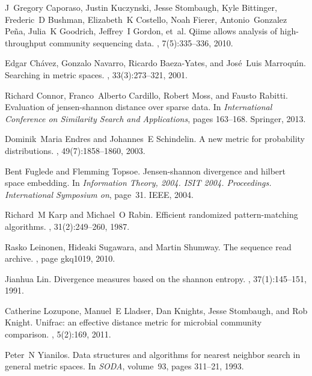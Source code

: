 \documentclass[10pt,letterpaper]{article}
\begin{document}
\begin{thebibliography}{10}

J~Gregory Caporaso, Justin Kuczynski, Jesse Stombaugh, Kyle Bittinger,
  Frederic~D Bushman, Elizabeth~K Costello, Noah Fierer, Antonio~Gonzalez
  Pe{\~n}a, Julia~K Goodrich, Jeffrey~I Gordon, et~al.
\newblock Qiime allows analysis of high-throughput community sequencing data.
, 7(5):335--336, 2010.

Edgar Ch{\'a}vez, Gonzalo Navarro, Ricardo Baeza-Yates, and Jos{\'e}~Luis
  Marroqu{\'\i}n.
\newblock Searching in metric spaces.
, 33(3):273--321, 2001.

Richard Connor, Franco~Alberto Cardillo, Robert Moss, and Fausto Rabitti.
\newblock Evaluation of jensen-shannon distance over sparse data.
\newblock In {\em International Conference on Similarity Search and
  Applications}, pages 163--168. Springer, 2013.

Dominik~Maria Endres and Johannes~E Schindelin.
\newblock A new metric for probability distributions.
, 49(7):1858--1860,
  2003.

Bent Fuglede and Flemming Topsoe.
\newblock Jensen-shannon divergence and hilbert space embedding.
\newblock In {\em Information Theory, 2004. ISIT 2004. Proceedings.
  International Symposium on}, page~31. IEEE, 2004.

Richard~M Karp and Michael~O Rabin.
\newblock Efficient randomized pattern-matching algorithms.
, 31(2):249--260, 1987.

Rasko Leinonen, Hideaki Sugawara, and Martin Shumway.
\newblock The sequence read archive.
, page gkq1019, 2010.

Jianhua Lin.
\newblock Divergence measures based on the shannon entropy.
, 37(1):145--151, 1991.

Catherine Lozupone, Manuel~E Lladser, Dan Knights, Jesse Stombaugh, and Rob
  Knight.
\newblock Unifrac: an effective distance metric for microbial community
  comparison.
, 5(2):169, 2011.

Peter~N Yianilos.
\newblock Data structures and algorithms for nearest neighbor search in general
  metric spaces.
\newblock In {\em SODA}, volume~93, pages 311--21, 1993.

\end{thebibliography}
\end{document}
